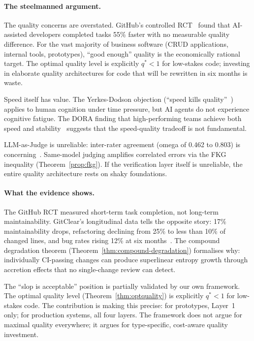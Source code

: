 \documentclass[11pt, a4paper]{googledeepmind}
\begin{document}
\paragraph{The steelmanned argument.}
The quality concerns are overstated. GitHub's controlled RCT~\citep{github2024rct} found that AI-assisted developers completed tasks 55\% faster with no measurable quality difference. For the vast majority of business software (CRUD applications, internal tools, prototypes), ``good enough'' quality is the economically rational target. The optimal quality level is explicitly $q^* < 1$ for low-stakes code; investing in elaborate quality architectures for code that will be rewritten in six months is waste.

Speed itself has value. The Yerkes-Dodson objection (``speed kills quality''~\citep{yerkes1908relation}) applies to human cognition under time pressure, but AI agents do not experience cognitive fatigue. The DORA finding that high-performing teams achieve both speed and stability~\citep{forsgren2018accelerate} suggests that the speed-quality tradeoff is not fundamental.

LLM-as-Judge is unreliable: inter-rater agreement (omega of 0.462 to 0.803) is concerning~\citep{llmjudgetrust2024}. Same-model judging amplifies correlated errors via the FKG inequality (Theorem~\ref{prop:fkg}). If the verification layer itself is unreliable, the entire quality architecture rests on shaky foundations.

\paragraph{What the evidence shows.}
The GitHub RCT measured short-term task completion, not long-term maintainability. GitClear's longitudinal data tells the opposite story: 17\% maintainability drops, refactoring declining from 25\% to less than 10\% of changed lines, and bug rates rising 12\% at six months~\citep{gitclear2025}. The compound degradation theorem (Theorem~\ref{thm:compound-degradation}) formalises why: individually CI-passing changes can produce superlinear entropy growth through accretion effects that no single-change review can detect.

The ``slop is acceptable'' position is partially validated by our own framework. The optimal quality level (Theorem~\ref{thm:optquality}) is explicitly $q^* < 1$ for low-stakes code. The contribution is making this precise: for prototypes, Layer~1 only; for production systems, all four layers. The framework does not argue for maximal quality everywhere; it argues for type-specific, cost-aware quality investment.
\end{document}
